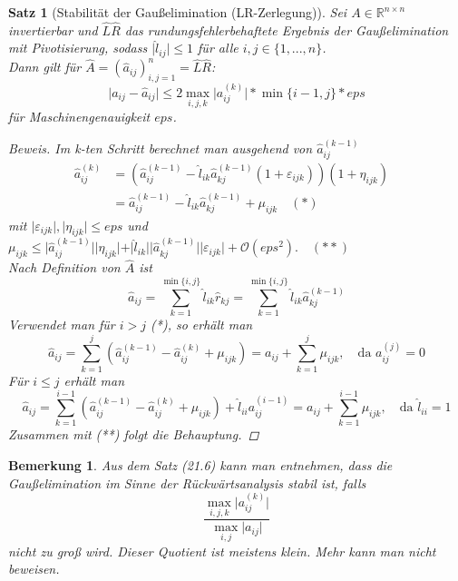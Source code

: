 \documentclass[12pt]{article}
\theoremstyle{break}
\newtheorem{theorem}{Satz}[subsection]
\newtheorem*{comment*}{Bemerkung}
\begin{document}
\begin{theorem}[Stabilität der Gaußelimination (LR-Zerlegung)]
Sei $A \in \mathbb{R}^{n \times n}$ invertierbar und $\hat{L}\hat{R}$ das rundungsfehlerbehaftete Ergebnis der Gaußelimination mit Pivotisierung, sodass $\vert \hat{l}_{ij} \vert \leq 1$ für alle $i,j \in \{1,..., n\}$. \\
Dann gilt für $\hat{A} = (\hat{a}_{ij})_{i,j=1}^n = \hat{L}\hat{R}$:
$$\vert a_{ij} - \hat{a}_{ij} \vert \leq 2 \max_{i,j,k} \vert a_{ij}^{(k)} \vert * \min\{i-1, j\} * eps$$
für Maschinengenauigkeit $eps$.
\begin{proof}[Beweis]
Im k-ten Schritt berechnet man ausgehend von $\hat{a}_{ij}^{(k-1)}$
\begin{align*}
\hat{a}_{ij}^{(k)} &= \left( \hat{a}_{ij}^{(k-1)} - \hat{l}_{ik} \hat{a}_{kj}^{(k-1)} ( 1+ \varepsilon_{ijk}) \right) ( 1+ \eta_{ijk}) &\\
&= \hat{a}_{ij}^{(k-1)} - \hat{l}_{ik} \hat{a}_{kj}^{(k-1)} + \mu_{ijk} \quad (*)
\end{align*}
mit $\vert \varepsilon_{ijk} \vert, \vert \eta_{ijk} \vert \leq eps$ und $\mu_{ijk} \leq \vert \hat{a}_{ij}^{(k-1)} \vert \vert \eta_{ijk} \vert + \vert \hat{l}_{ik} \vert \vert \hat{a}_{kj}^{(k-1)} \vert \vert \varepsilon_{ijk} \vert + \mathcal{O}(eps^2). \quad (**)$\\
Nach Definition von $\hat{A}$ ist 
$$\hat{a}_{ij} = \sum_{k=1}^{\min\{i,j\}} \hat{l}_{ik} \hat{r}_{kj} = \sum_{k=1}^{\min\{i,j\}} \hat{l}_{ik} \hat{a}_{kj}^{(k-1)}$$ 
Verwendet man für $i > j$ (*), so erhält man
$$\hat{a}_{ij} = \sum_{k=1}^j \left( \hat{a}_{ij}^{(k-1)} - \hat{a}_{ij}^{(k)} + \mu_{ijk} \right) = a_{ij} + \sum_{k=1}^j \mu_{ijk}, \quad \text{da } a_{ij}^{(j)} = 0$$
Für $i \leq j $ erhält man
$$\hat{a}_{ij} = \sum_{k=1}^{i-1} \left( \hat{a}_{ij}^{(k-1)} - \hat{a}_{ij}^{(k)} + \mu_{ijk} \right) + \hat{l}_{ii} a_{ij}^{(i-1)}= a_{ij} + \sum_{k=1}^{i-1} \mu_{ijk}, \quad \text{da } \hat{l}_{ii} = 1$$
Zusammen mit (**) folgt die Behauptung.
\end{proof}
\end{theorem}

\begin{comment*}
Aus dem Satz (21.6) kann man entnehmen, dass die Gaußelimination im Sinne der Rückwärtsanalysis stabil ist, falls 
$$\frac{\max_{i,j,k} \vert a_{ij}^{(k)}\vert}{\max_{i,j} \vert a_{ij} \vert }$$
nicht zu groß wird. Dieser Quotient ist meistens klein. Mehr kann man nicht beweisen.
\end{comment*}
\end{document}
